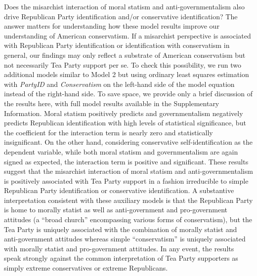 \documentclass[12pt,]{article}
\begin{document}
Does the misarchist interaction of moral statism and
anti-governmentalism also drive Republican Party identification and/or
conservative identification? The answer matters for understanding how
these model results improve our understanding of American conservatism.
If a misarchist perspective is associated with Republican Party
identification or identification with conservatism in general, our
findings may only reflect a substrate of American conservatism but not
necessarily Tea Party support per se. To check this possibility, we run
two additional models similar to Model 2 but using ordinary least
squares estimation with \emph{PartyID} and \emph{Conservatism} on the
left-hand side of the model equation instead of the right-hand side. To
save space, we provide only a brief discussion of the results here, with
full model results available in the Supplementary Information. Moral
statism positively predicts and governmentalism negatively predicts
Republican identification with high levels of statistical significance,
but the coefficient for the interaction term is nearly zero and
statistically insignificant. On the other hand, considering conservative
self-identification as the dependent variable, while both moral statism
and governmentalism are again signed as expected, the interaction term
is positive and significant. These results suggest that the misarchist
interaction of moral statism and anti-governmentalism is positively
associated with Tea Party support in a fashion irreducible to simple
Republican Party identification or conservative identification. A
substantive interpretation consistent with these auxiliary models is
that the Republican Party is home to morally statist as well as
anti-government and pro-government attitudes (a ``broad church''
encompassing various forms of conservatism), but the Tea Party is
uniquely associated with the combination of morally statist and
anti-government attitudes whereas simple ``conservatism'' is uniquely
associated with morally statist and pro-government attitudes. In any
event, the results speak strongly against the common interpretation of
Tea Party supporters as simply extreme conservatives or extreme
Republicans.

\pagebreak

\singlespacing
\end{document}
